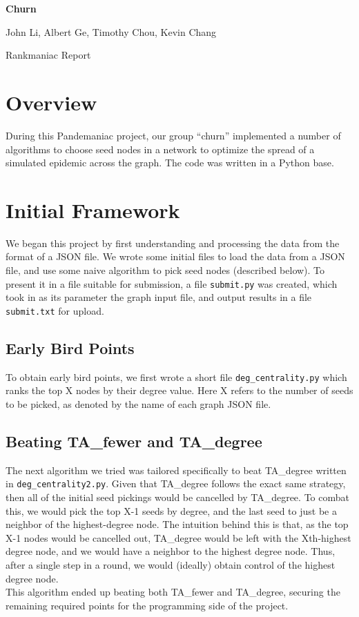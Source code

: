 \documentclass{article}
\begin{document}
\pagestyle{fancy}

\LARGE
\begin{center}
\textbf{Churn}

\large
John Li, Albert Ge, Timothy Chou, Kevin Chang

Rankmaniac Report

\end{center}

\normalsize
\medskip

\section{Overview}
During this Pandemaniac project, our group ``churn'' implemented a number of algorithms to choose 
seed nodes in a network to optimize the spread of a simulated epidemic across the graph. 
The code was written in a Python base. 

\section{Initial Framework}
    We began this project by first understanding and processing the data from the format of a JSON file.
    We wrote some initial files to load the data from a JSON file, and use some naive algorithm to
    pick seed nodes (described below).
    To present it in a file suitable for submission, a file \texttt{submit.py} was 
    created, which took in as its parameter the graph input file, and output results in a file
    \texttt{submit.txt} for upload.
    
    \subsection*{Early Bird Points} 
    To obtain early bird points, we first wrote a short file \texttt{deg\_centrality.py} which
    ranks the top X nodes by their degree value. Here X refers to the number of seeds
    to be picked, as denoted by the name of each graph JSON file. 
    
    \subsection*{Beating TA\_fewer and TA\_degree}
    The next algorithm we tried was tailored specifically to beat TA\_degree
    written in \texttt{deg\_centrality2.py}. Given that
    TA\_degree follows the exact same strategy, then all of the initial seed pickings
    would be cancelled by TA\_degree. To combat this, we would pick the top X-1 seeds by degree,
    and the last seed to just be a neighbor of the highest-degree node. The intuition 
    behind this is that, as the top X-1 nodes would be cancelled out, TA\_degree would be 
    left with the Xth-highest degree node, and we would have a neighbor to the 
    highest degree node. Thus, after a single step in a round, we would (ideally) obtain
    control of the highest degree node. 
    \\
    This algorithm ended up beating both TA\_fewer and TA\_degree, securing the remaining
    required points for the programming side of the project. 
     
\end{document}
